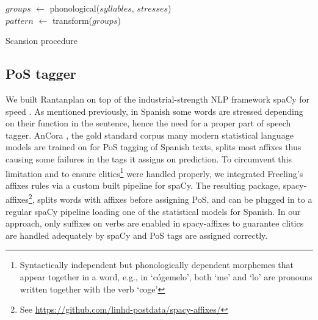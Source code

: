 \documentclass[a4paper,11pt,twocolumn,twoside]{article}
\begin{document}
\begin{algorithm} \label{alg:algo.1}
\SetAlgoLined
{}
 $groups$ $\gets$ phonological($syllables$, $stresses$) \\
 $pattern$ $\gets$ transform($groups$)\\
 \caption{Scansion procedure}
\end{algorithm}

\subsection{PoS tagger}
We built Rantanplan on top of the industrial-strength NLP framework spaCy for speed \cite{honnibal2017spacy}. As mentioned previously, in Spanish some words are stressed depending on their function in the sentence, hence the need for a proper part of speech tagger. AnCora \cite{taule2008ancora}, the gold standard corpus many modern statistical language models are trained on for PoS tagging of Spanish texts, splits most affixes thus causing some failures in the tags it assigns on prediction. To circumvent this limitation and to ensure clitics\footnote{Syntactically independent but phonologically dependent morphemes that appear together in a word, e.g., in `cógemelo', both `me' and `lo' are pronouns written together with the verb `coge'} were handled properly, we integrated Freeling's affixes rules via a custom built pipeline for spaCy. The resulting package, spacy-affixes\footnote{See \url{https://github.com/linhd-postdata/spacy-affixes/}}, splits words with affixes before assigning PoS, and can be plugged in to a regular spaCy pipeline loading one of the statistical models for Spanish. In our approach, only suffixes on verbs are enabled in spacy-affixes to guarantee clitics are handled adequately by spaCy and PoS tags are assigned correctly.
\end{document}
